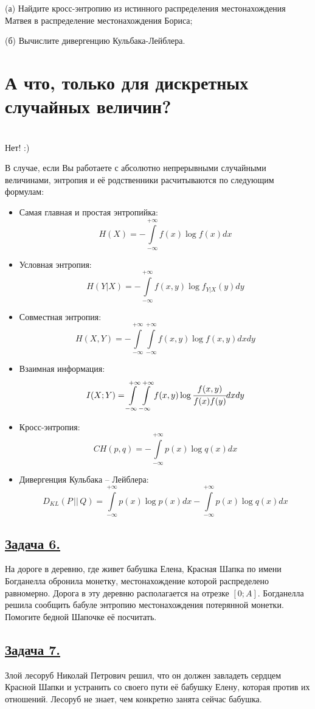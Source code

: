 (а) Найдите кросс-энтропию из истинного распределения местонахождения Матвея в распределение местонахождения Бориса;

(б) Вычислите дивергенцию Кульбака-Лейблера.

\section*{А что, только для дискретных случайных величин?}~\
\\

Нет! :)

В случае, если Вы работаете с абсолютно непрерывными случайными величинами, энтропия и её родственники расчитываются по следующим формулам:
\begin{itemize}
    \item Самая главная и простая энтропийка:
    \[H(X)=-\int\limits_{-\infty}^{+\infty} f(x)\log f(x)dx \]
    \item Условная энтропия:
    \[H(Y|X)=-\int\limits_{-\infty}^{+\infty} f(x, y)\log f_{Y|X}(y)dy \]
    \item Совместная энтропия:
    \[H(X, Y)=-\int\limits_{-\infty}^{+\infty} \int\limits_{-\infty}^{+\infty} f(x, y)\log f(x, y)dxdy \]
    \item Взаимная информация:
    \[I(X; Y)=\int\limits_{-\infty}^{+\infty} \int\limits_{-\infty}^{+\infty} f(x, y) \log \cfrac{f(x, y)}{f(x)f(y)}dxdy \]
    \item Кросс-энтропия:
    \[CH(p, q)=-\int\limits_{-\infty}^{+\infty}p(x)\log q(x) dx \]
    \item Дивергенция Кульбака -- Лейблера:
    \[D_{KL}(P\, ||\, Q)=\int\limits_{-\infty}^{+\infty} p(x)\log p(x)dx -\int\limits_{-\infty}^{+\infty} p(x)\log q(x)dx  \]
\end{itemize}

\subsection*{\hyperref[sec:sol_problem6]{Задача 6.}}\label{sec:problem6} На дороге в деревню, где живет бабушка Елена, Красная Шапка по имени Богданелла обронила монетку, местонахождение которой распределено равномерно. Дорога в эту деревню располагается на отрезке $[0; A]$. Богданелла решила сообщить бабуле энтропию местонахождения потерянной монетки. Помогите бедной Шапочке её посчитать.

\subsection*{\hyperref[sec:sol_problem7]{Задача 7.}}\label{sec:problem7} Злой лесоруб Николай Петрович решил, что он должен завладеть сердцем Красной Шапки и устранить со своего пути её бабушку Елену, которая против их отношений. Лесоруб не знает, чем конкретно занята сейчас бабушка.

